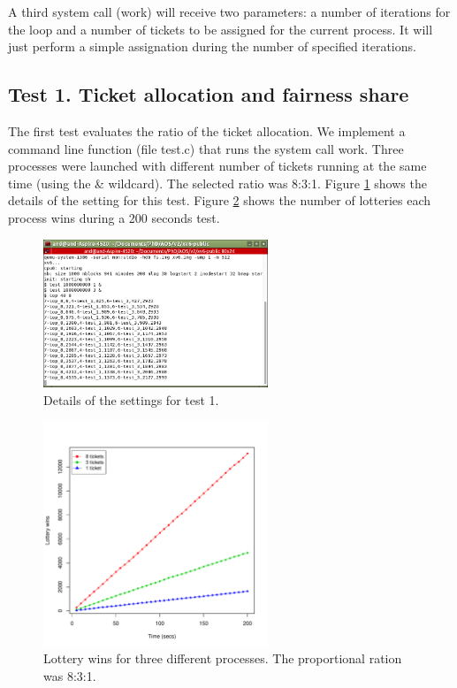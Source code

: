 \documentclass[10pt]{scrartcl}
\begin{document}
A third system call (work) will receive two parameters: a number of iterations for the loop and a number of tickets to be assigned for the current process.  It will just perform a simple assignation during the number of specified iterations.

\subsection{Test 1. Ticket allocation and fairness share}
The first test evaluates the ratio of the ticket allocation.  We implement a command line function (file test.c) that runs the system call work.  Three processes were launched with different number of tickets running at the same time (using the \& wildcard).  The selected ratio was 8:3:1.  Figure \ref{fig:test1} shows the details of the setting for this test. Figure \ref{fig:test1a} shows the number of lotteries each process wins during a 200 seconds test. 

\begin{figure}
  \centering
  \includegraphics[width=0.6\textwidth]{test1.png}
  \caption{Details of the settings for test 1.}\label{fig:test1}
\end{figure}

\begin{figure}
  \centering
  \includegraphics[width=0.6\textwidth]{test1a}
  \caption{Lottery wins for three different processes. The proportional ration was 8:3:1.}\label{fig:test1a}
\end{figure}
\end{document}
